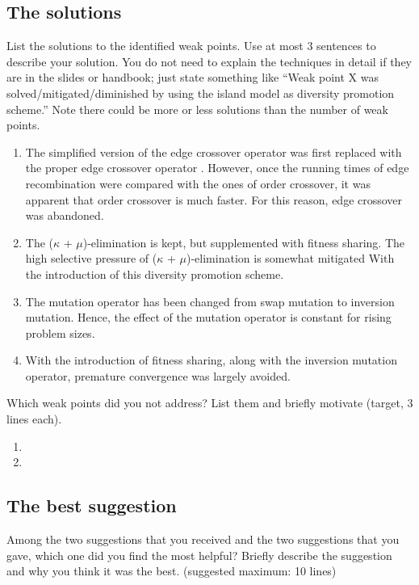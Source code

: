 \documentclass[a4paper,10pt]{article}
\newcommand{\ReplaceMe}[1]{{\color{blue}#1}}
\begin{document}
\subsection{The solutions}
\ReplaceMe{List the solutions to the identified weak points. Use at most 3 sentences to describe your solution. You do not need to explain the techniques in detail if they are in the slides or handbook; just state something like ``Weak point X was solved/mitigated/diminished by using the island model as diversity promotion scheme.'' Note there could be more or less solutions than the number of weak points.}

\begin{enumerate}
 \item The simplified version of the edge crossover operator was first replaced with the proper edge crossover operator \cite{eiben_smith}. However, once the running times of edge recombination were compared with the ones of order crossover, it was apparent that order crossover is much faster. For this reason, edge crossover was abandoned.
 \item The ($\kappa$ + $\mu$)-elimination is kept, but supplemented with fitness sharing. The high selective pressure of ($\kappa$ + $\mu$)-elimination is somewhat mitigated With the introduction of this diversity promotion scheme.
 \item The mutation operator has been changed from swap mutation to inversion mutation. Hence, the effect of the mutation operator is constant for rising problem sizes.
 \item With the introduction of fitness sharing, along with the inversion mutation operator, premature convergence was largely avoided.
\end{enumerate}

\ReplaceMe{Which weak points did you not address? List them and briefly motivate (target, 3 lines each).}

\begin{enumerate}
 \item 
 \item 
\end{enumerate}

\subsection{The best suggestion}
\ReplaceMe{Among the two suggestions that you received and the two suggestions that you gave, which one did you find the most helpful? Briefly describe the suggestion and why you think it was the best. (suggested maximum: 10 lines)}
\end{document}
